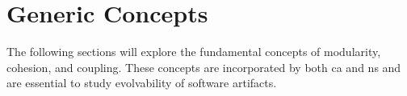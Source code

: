 \section{Generic Concepts} \label{section_key_concepts}

The following sections will explore the fundamental concepts of modularity, cohesion, and
coupling. These concepts are incorporated by both \gls{ca} and \gls{ns} and are 
essential to study evolvability of software artifacts.




